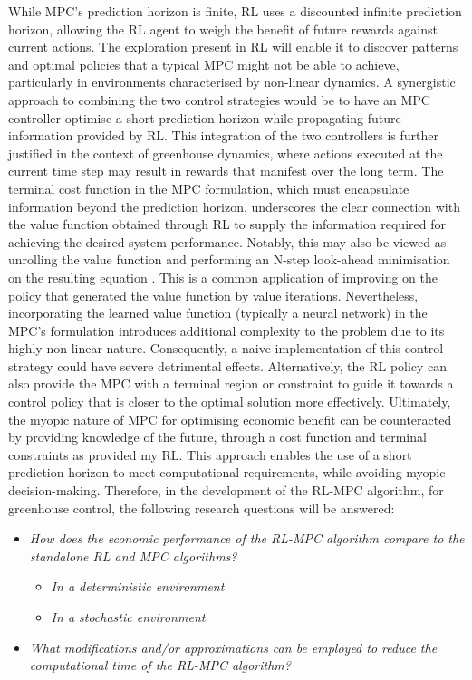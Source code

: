 While MPC's prediction horizon is finite, RL uses a discounted infinite prediction horizon, allowing the RL agent to weigh the benefit of future rewards against current actions. The exploration present in RL will enable it to discover patterns and optimal policies that a typical MPC might not be able to achieve, particularly in environments characterised by non-linear dynamics. A synergistic approach to combining the two control strategies would be to have an MPC controller optimise a short prediction horizon while propagating future information provided by RL. This integration of the two controllers is further justified in the context of greenhouse dynamics, where actions executed at the current time step may result in rewards that manifest over the long term. The terminal  cost function in the MPC formulation, which must encapsulate information beyond the prediction horizon, underscores the clear connection with the value function obtained through RL to supply the information required for achieving the desired system performance. Notably, this may also be viewed as unrolling the value function and performing an N-step look-ahead minimisation on the resulting equation \cite{bertsekasNewtonMethodReinforcement2022}. This is a common application of improving on the policy that generated the value function by value iterations. Nevertheless, incorporating the learned value function (typically a neural network) in the MPC's formulation introduces additional complexity to the problem due to its highly non-linear nature. Consequently, a naive implementation of this control strategy could have severe detrimental effects. Alternatively, the RL policy can also provide the MPC with a terminal region or constraint to guide it towards a control policy that is closer to the optimal solution more effectively. Ultimately, the myopic nature of MPC for optimising economic benefit can be counteracted by providing knowledge of the future, through a cost function and terminal constraints as provided my RL. This approach enables the use of a short prediction horizon to meet computational requirements, while avoiding myopic decision-making. Therefore, in the development of the RL-MPC algorithm, for greenhouse control, the following research questions will be answered:

\begin{itemize}[itemsep=7pt] %
	\item \textit{How does the economic performance of the RL-MPC algorithm compare to the standalone RL and MPC algorithms?} \begin{itemize}
		\item \textit{In a deterministic environment}
		\item \textit{In a stochastic environment}
	\end{itemize}
	\item \textit{What modifications and/or approximations can be employed to reduce the computational time of the RL-MPC algorithm?}
\end{itemize}




